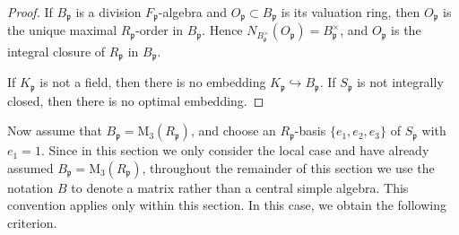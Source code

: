 \documentclass[12pt]{article}
\theoremstyle{plain}
\theoremstyle{definition}
\theoremstyle{remark}
\begin{document}
\begin{proof}
If $B_\mathfrak{p}$ is a division $F_\mathfrak{p}$-algebra and $O_\mathfrak{p}\subset B_\mathfrak{p}$ is its valuation ring, then $O_\mathfrak{p}$ is the unique maximal $R_\mathfrak{p}$-order in $B_\mathfrak{p}$. Hence $N_{B_\mathfrak{p}^\times}(O_\mathfrak{p})=B_\mathfrak{p}^\times$, and $O_\mathfrak{p}$ is the integral closure of $R_\mathfrak{p}$ in $B_\mathfrak{p}$.

If $K_\mathfrak{p}$ is not a field, then there is no embedding $K_\mathfrak{p}\hookrightarrow B_\mathfrak{p}$. If $S_\mathfrak{p}$ is not integrally closed, then there is no optimal embedding.
\end{proof}

Now assume that $B_\mathfrak{p} = \mathrm{M}_3(R_\mathfrak{p})$, and choose an $R_\mathfrak{p}$-basis $\{e_1, e_2, e_3\}$ of $S_\mathfrak{p}$ with $e_1 = 1$. Since in this section we only consider the local case and have already assumed $B_\mathfrak{p} = \mathrm{M}_3(R_\mathfrak{p})$, throughout the remainder of this section we use the notation $B$ to denote a matrix rather than a central simple algebra. This convention applies only within this section. In this case, we obtain the following criterion.
\end{document}
